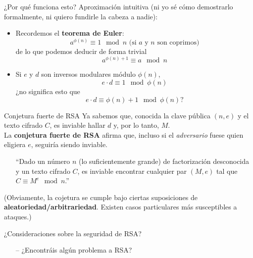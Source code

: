 \documentclass[10pt]{beamer} %
\begin{document}
\begin{frame}{¿Por qué funciona esto?}
Aproximación intuitiva (ni yo sé cómo demostrarlo formalmente, ni quiero fundirle la cabeza a nadie):
    \begin{itemize}
        \item Recordemos el \textbf{teorema de Euler}: \[a^{\phi(n)} \equiv 1 \mod n \text{ (si $a$ y $n$ son coprimos)}\] de lo que podemos deducir de forma trivial \[a^{\phi(n) + 1} \equiv a \mod n\]
        \item Si $e$ y $d$ son inversos modulares módulo $\phi(n)$, \[e \cdot d \equiv 1 \mod \phi(n)\] ¿no significa esto que \[e \cdot d \equiv \phi(n) + 1 \mod \phi(n)?\]
    \end{itemize}
\end{frame}
\begin{frame}{Conjetura fuerte de RSA}
    Ya sabemos que, conocida la clave pública $(n, e)$ y el texto cifrado $C$, es inviable hallar $d$ y, por lo tanto, $M$.\\
    La \textbf{conjetura fuerte de RSA} afirma que, incluso si el \textit{adversario} fuese quien eligiera $e$, seguiría siendo inviable.
    \begin{itemize}
        \item[] ``Dado un número $n$ (lo suficientemente grande) de factorización desconocida y un texto cifrado $C$, es inviable encontrar cualquier par $(M, e)$ tal que $C \equiv M^e \mod n$.''
    \end{itemize}
    (Obviamente, la cojetura se cumple bajo ciertas suposiciones de \textbf{aleatoriedad/arbitrariedad}. Existen casos particulares más susceptibles a ataques.)
\end{frame}
\begin{frame}{¿Consideraciones sobre la seguridad de RSA?}
\begin{itemize}
    \item[--] ¿Encontráis algún problema a RSA?
\end{itemize}
\end{frame}
\end{document}
